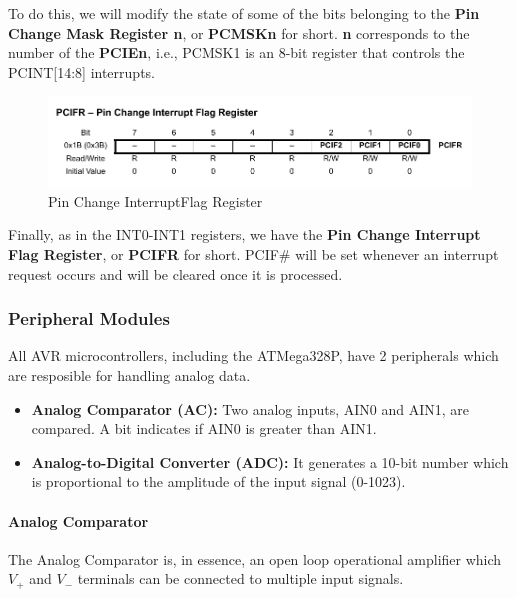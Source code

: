 To do this, we will modify the state of some of the bits belonging to the \textbf{Pin Change Mask Register n}, or \textbf{PCMSKn} for short. \textbf{n} corresponds to the number of the \textbf{PCIEn}, i.e., PCMSK1 is an 8-bit register that controls the PCINT[14:8] interrupts. 


\begin{figure}[H]
    \centering
    \includegraphics[width = \textwidth]{Graphics/MICROS/Practice 3/DATASHEET/PCIFR.pdf}
    \caption{Pin Change InterruptFlag Register~\autocite{ATMEGA328P}}
    \label{fig:PCIFR}
\end{figure}

Finally, as in the INT0-INT1 registers, we have the \textbf{Pin Change Interrupt Flag Register}, or \textbf{PCIFR} for short. PCIF\# will be set whenever an interrupt request occurs and will be cleared once it is processed.


\subsubsection{Peripheral Modules}

All AVR microcontrollers, including the ATMega328P, have 2 peripherals which are resposible for handling analog data.~\autocite{SLIDES_MICROS}

\begin{itemize}
    \item \textbf{Analog Comparator (AC):} Two analog inputs, AIN0 and AIN1, are compared. A bit indicates if AIN0 is greater than AIN1.
    \item \textbf{Analog-to-Digital Converter (ADC):} It generates a 10-bit number which is proportional to the amplitude of the input signal (0-1023).
\end{itemize}

\paragraph{Analog Comparator}

The Analog Comparator is, in essence, an open loop operational amplifier which $V_{+}$ and $V_{-}$ terminals can be connected to multiple input signals.\medskip

